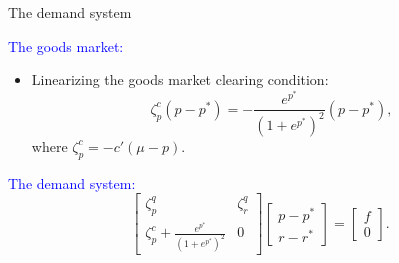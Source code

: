 \begin{frame}{The demand system}
	
	\textcolor{blue}{The goods market:}
	\begin{itemize}
		\item Linearizing the goods market clearing condition:
		\[ \zeta_p^c(p - p^*) = - \frac{e^{p^*}}{(1+e^{p^*})^2} (p-p^*),\]
		where $\zeta^c_p = - c'(\mu - p)$.
	\end{itemize} 

\vspH

	\textcolor{blue}{The demand system:}
	\[
	\left[ 
	\begin{matrix}
		\zeta_p^q & \zeta_r^q \\
		\zeta_p^c + \frac{e^{p^*}}{(1+e^{p^*})^2} & 0
	\end{matrix}
	\right] \left[ 
	\begin{matrix}
		p-p^*\\
		r-r^*
	\end{matrix}
	\right] = 
	\left[ 
	\begin{matrix}
		f\\
		0
		\end{matrix}
	\right].
	\]
\end{frame}

